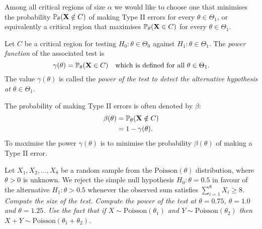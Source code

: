 Among all critical regions of size $\alpha$ we would like to choose one that minimises the probability $\mathbb{P}_{\theta}(\mathbf{X}\notin C)$ of making Type II errors for every $\theta\in\Theta_1$, or equivalently a critical region that maximises $\mathbb{P}_{\theta}(\mathbf{X}\in C)$ for every $\theta\in\Theta_1$. 

\begin{definition}
Let $C$ be a critical region for testing $H_0:\theta\in\Theta_0$ against $H_1:\theta\in\Theta_1$. 
The \emph{power function} of the associated test is 
\[
\gamma(\theta) = \mathbb{P}_{\theta}(\mathbf{X}\in C) \quad\text{which is defined for all $\theta\in\Theta_1$.}
\]
The value $\gamma(\theta)$ is called the \emph{power of the test to detect the alternative hypothesis at $\theta\in\Theta_1$}.
\end{definition}

\begin{remark}
The probability of making Type II errors is often denoted by $\beta$:
\begin{align*}
\beta(\theta) 
	& = \prob_{\theta}(\mathbf{X}\notin C) \\
	& = 1-\gamma(\theta).%
\end{align*}
To maximise the power $\gamma(\theta)$ is to minimise the probability $\beta(\theta)$ of making a Type II error.
\end{remark}

%
\begin{example}
Let $X_1,X_2,\ldots,X_8$ be a random sample from the $\text{Poisson}(\theta)$ distribution, where $\theta>0$ is unknown. We reject the simple null hypothesis $H_0:\theta=0.5$ in favour of the alternative $H_1:\theta>0.5$ whenever the observed sum satisfies $\sum_{i=1}^8 X_i \geq 8$.
\ben
\it Compute the size of the test.
\it Compute the power of the test at $\theta = 0.75$, $\theta = 1.0$ and $\theta = 1.25$.
\een
Use the fact that if $X\sim\text{Poisson}(\theta_1)$ and $Y\sim\text{Poisson}(\theta_2)$ then $X+Y\sim\text{Poisson}(\theta_1+\theta_2)$.
\end{example}

